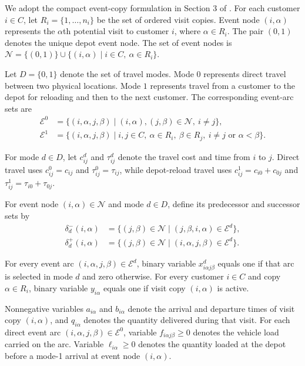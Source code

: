 \documentclass[10pt]{article}
\begin{document}
We adopt the compact event-copy formulation in Section 3 of \citet{wang2025}. For each customer $i\in C$, let $R_i=\{1,\ldots,n_i\}$ be the set of ordered visit copies. Event node $(i,\alpha)$ represents the $\alpha$th potential visit to customer $i$, where $\alpha\in R_i$. The pair $(0,1)$ denotes the unique depot event node. The set of event nodes is $\mathcal N=\{(0,1)\}\cup\{(i,\alpha)\mid i\in C,\ \alpha\in R_i\}$.

Let $D=\{0,1\}$ denote the set of travel modes. Mode $0$ represents direct travel between two physical locations. Mode $1$ represents travel from a customer to the depot for reloading and then to the next customer. The corresponding event-arc sets are
\begin{align*}
\mathcal E^0
&=
\{(i,\alpha,j,\beta)
\mid
(i,\alpha),(j,\beta)\in\mathcal N,\ i\ne j\},\\
\mathcal E^1
&=
\{(i,\alpha,j,\beta)
\mid
i,j\in C,\ \alpha\in R_i,\ \beta\in R_j,\
i\ne j\text{ or }\alpha<\beta\}.
\end{align*}

For mode $d\in D$, let $c_{ij}^d$ and $\tau_{ij}^d$ denote the travel cost and time from $i$ to $j$. Direct travel uses $c_{ij}^0=c_{ij}$ and $\tau_{ij}^0=\tau_{ij}$, while depot-reload travel uses $c_{ij}^1=c_{i0}+c_{0j}$ and $\tau_{ij}^1=\tau_{i0}+\tau_{0j}$.

For event node $(i,\alpha)\in\mathcal N$ and mode $d\in D$, define its predecessor and successor sets by
\begin{align*}
\delta_d^-(i,\alpha)
&=
\{(j,\beta)\in\mathcal N
\mid
(j,\beta,i,\alpha)\in\mathcal E^d\},\\
\delta_d^+(i,\alpha)
&=
\{(j,\beta)\in\mathcal N
\mid
(i,\alpha,j,\beta)\in\mathcal E^d\}.
\end{align*}

For every event arc $(i,\alpha,j,\beta)\in\mathcal E^d$, binary variable $x^d_{i\alpha j\beta}$ equals one if that arc is selected in mode $d$ and zero otherwise. For every customer $i\in C$ and copy $\alpha\in R_i$, binary variable $y_{i\alpha}$ equals one if visit copy $(i,\alpha)$ is active.

Nonnegative variables $a_{i\alpha}$ and $b_{i\alpha}$ denote the arrival and departure times of visit copy $(i,\alpha)$, and $q_{i\alpha}$ denotes the quantity delivered during that visit. For each direct event arc $(i,\alpha,j,\beta)\in\mathcal E^0$, variable $f_{i\alpha j\beta}\ge0$ denotes the vehicle load carried on the arc. Variable $\ell_{i\alpha}\ge0$ denotes the quantity loaded at the depot before a mode-1 arrival at event node $(i,\alpha)$.
\end{document}
